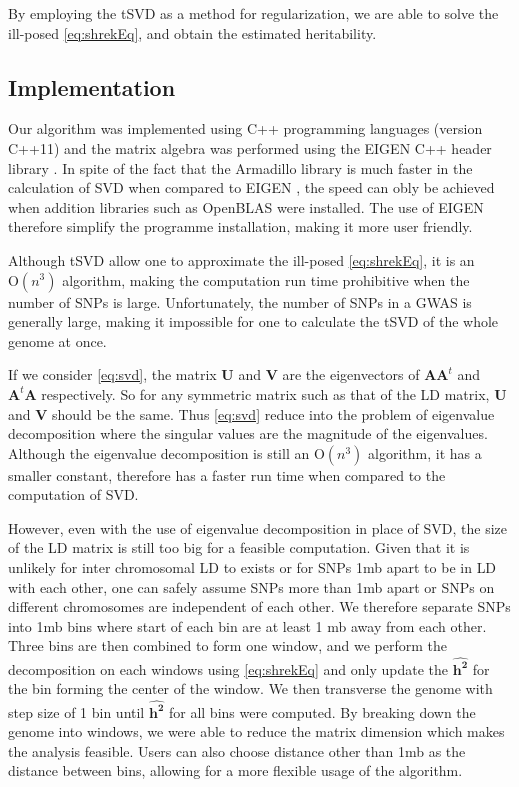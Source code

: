 \documentclass[12pt]{scrbook}
\begin{document}
By employing the \gls{tSVD} as a method for regularization, we are able to solve the ill-posed \cref{eq:shrekEq}, and obtain the estimated heritability.
\subsection{Implementation}
Our algorithm was implemented using C++ programming languages (version C++11) and the matrix algebra was performed using the EIGEN C++ header library \citep{eigenweb}.
In spite of the fact that the Armadillo library \citep{Sanderson2010} is much faster in the calculation of \gls{SVD} when compared to EIGEN \citep{Ho2011}, the speed can obly be achieved when addition libraries such as OpenBLAS were installed. 
The use of EIGEN therefore simplify the programme installation, making it more user friendly. 

Although \gls{tSVD} allow one to approximate the ill-posed \cref{eq:shrekEq}, it is an $\mathrm{O}(n^3)$ algorithm, making the computation run time prohibitive when the number of \glspl{SNP} is large.
Unfortunately, the number of \glspl{SNP} in a \gls{GWAS} is generally large, making it impossible for one to calculate the \gls{tSVD} of the whole genome at once. 

If we consider \cref{eq:svd}, the matrix $\boldsymbol{U}$ and $\boldsymbol{V}$ are the eigenvectors of $\boldsymbol{AA}^t$ and $\boldsymbol{A}^t\boldsymbol{A}$ respectively. 
So for any symmetric matrix such as that of the \gls{LD} matrix, $\boldsymbol{U}$ and $\boldsymbol{V}$ should be the same. 
Thus \cref{eq:svd} reduce into the problem of eigenvalue decomposition where the singular values are the magnitude of the eigenvalues. 
Although the eigenvalue decomposition is still an $\mathrm{O}(n^3)$ algorithm, it has a smaller constant, therefore has a faster run time when compared to the computation of \gls{SVD}. 

However, even with the use of eigenvalue decomposition in place of \gls{SVD}, the size of the \gls{LD} matrix is still too big for a feasible computation. 
Given that it is unlikely for inter chromosomal \gls{LD} to exists or for \glspl{SNP} 1\gls{mb} apart to be in \gls{LD} with each other, one can safely assume \glspl{SNP} more than 1\gls{mb} apart or \glspl{SNP} on different chromosomes are independent of each other. 
We therefore separate \glspl{SNP} into 1\gls{mb} bins where start of each bin are at least 1 \gls{mb} away from each other. 
Three bins are then combined to form one window, and we perform the decomposition on each windows using \cref{eq:shrekEq} and only update the $\boldsymbol{\hat{h^2}}$ for the bin forming the center of the window.
We then transverse the genome with step size of 1 bin until $\boldsymbol{\hat{h^2}}$ for all bins were computed. 
By breaking down the genome into windows, we were able to reduce the matrix dimension which makes the analysis feasible.
Users can also choose distance other than 1\gls{mb} as the distance between bins, allowing for a more flexible usage of the algorithm.
\end{document}
